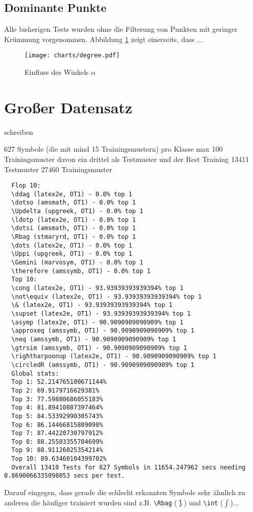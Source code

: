 \subsection{Dominante Punkte} %
\label{sub:dominante_punkte}

Alle bisherigen Tests wurden ohne die Filterung von Punkten mit geringer Krümmung vorgenommen. Abbildung \ref{chart:degree} zeigt einerseits, dass ...\TODO

\begin{figure}[htbp]
  \begin{center}
    \texttt{[image: charts/degree.pdf]}
  \end{center}
  \caption{Einfluss des Winkels $\alpha$}
  \label{chart:degree}
\end{figure}


\section{Großer Datensatz}
\label{sec:grosser_datensatz}

\TODO schreiben

627 Symbole (die mit mind 15 Trainingsmustern) pro Klasse max 100 Trainingsmuster davon ein drittel als Testmuster und der Rest Training
13411 Testmuster
27460 Trainingsmuster

\begin{verbatim}
  Flop 10:
  \ddag (latex2e, OT1) - 0.0% top 1
  \dotso (amsmath, OT1) - 0.0% top 1
  \Updelta (upgreek, OT1) - 0.0% top 1
  \ldotp (latex2e, OT1) - 0.0% top 1
  \dotsi (amsmath, OT1) - 0.0% top 1
  \Rbag (stmaryrd, OT1) - 0.0% top 1
  \dots (latex2e, OT1) - 0.0% top 1
  \Uppi (upgreek, OT1) - 0.0% top 1
  \Gemini (marvosym, OT1) - 0.0% top 1
  \therefore (amssymb, OT1) - 0.0% top 1
  Top 10:
  \cong (latex2e, OT1) - 93.93939393939394% top 1
  \not\equiv (latex2e, OT1) - 93.93939393939394% top 1
  \& (latex2e, OT1) - 93.93939393939394% top 1
  \supset (latex2e, OT1) - 93.93939393939394% top 1
  \asymp (latex2e, OT1) - 90.9090909090909% top 1
  \approxeq (amssymb, OT1) - 90.9090909090909% top 1
  \neq (amssymb, OT1) - 90.9090909090909% top 1
  \gtrsim (amssymb, OT1) - 90.9090909090909% top 1
  \rightharpoonup (latex2e, OT1) - 90.9090909090909% top 1
  \circledR (amssymb, OT1) - 90.9090909090909% top 1
  Global stats:
  Top 1: 52.214765100671144%
  Top 2: 69.9179716629381%
  Top 3: 77.59880686055183%
  Top 4: 81.89410887397464%
  Top 5: 84.53392990305743%
  Top 6: 86.14466815809098%
  Top 7: 87.44220730797912%
  Top 8: 88.25503355704699%
  Top 9: 88.91126025354214%
  Top 10: 89.63460104399702%
  Overall 13410 Tests for 627 Symbols in 11654.247962 secs needing 0.8690066335098053 secs per test.
\end{verbatim}

\TODO Darauf eingegen, dass gerade die schlecht erkannten Symbole sehr ähnlich zu anderen die häufiger trainiert wurden sind z.B. \verb!\Rbag! ($\Rbag$) und \verb!\int! ($\int$)...